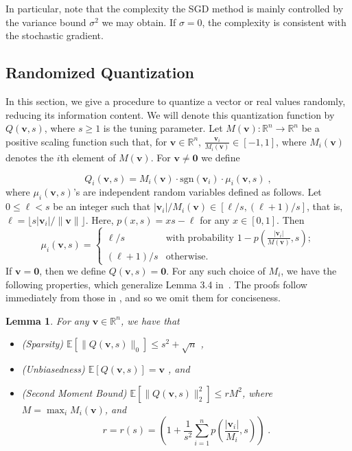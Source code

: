 \documentclass{article}
\newcommand{\R}{\mathbb{R}}
\newcommand{\sgn}[1]{\mbox{sgn}(#1)}
\renewcommand{\vec}[1]{\mathbf{#1}}
\def\E{\mathbb{E}}
\newtheorem{lemma}{Lemma}
\begin{document}
In particular, note that the complexity the SGD method is mainly controlled by the variance bound $\sigma^2$ we may obtain. If $\sigma = 0$, the complexity is consistent with the stochastic gradient.



\subsection{Randomized Quantization}

In this section, we give a procedure to quantize a vector or real values randomly, reducing its information content. We will denote this quantization function by $Q(\vec{v},s)$, where $s\geq 1$ is the tuning parameter. 
Let $M(\vec{v}): \R^n \rightarrow \R^n$ be a positive scaling function such that, for $\vec{v}\in \R^n$, $\frac{\vec{v}_i}{M_i(\vec{v})} \in [-1, 1]$, where $M_i(\vec{v})$ denotes the $i$th element of $M(\vec{v})$.
For $\vec{v} \neq \vec{0}$ we define

\begin{equation}
Q_i(\vec{v},s) = M_i(\vec{v}) \cdot \sgn{\vec{v}_i} \cdot \mu_i(\vec{v},s) \; , \label{equ:quant2}
\end{equation}
where $\mu_i(\vec{v},s)$'s are independent random variables defined as follows. 
Let $0 \leq \ell < s$ be an integer such that $|\vec{v}_i|/M_i(\vec{v}) \in [ \ell / s, (\ell + 1) / s ]$, that is, $\ell = \lfloor s |\vec{v}_i|/\| \vec{v} \| \rfloor$. 
Here, $p(x,s) = x s - \ell$ for any $x \in [0,1]$.
Then 
\[
\mu_i(\vec{v},s) = \left\{ \begin{array}{ll}
         \ell / s & \mbox{with probability $1 - p\left(\frac{|\vec{v}_i|}{M(\vec{v})},s\right)$};\\
         (\ell + 1) / s & \mbox{otherwise}. \end{array} \right.
\]
If $\vec{v} = \vec{0}$, then we define $Q(\vec{v},s) = \vec{0}$.
For any such choice of $M_i$, we have the following properties, which generalize Lemma 3.4 in~\cite{Alistarh:2016:ArXiv}.
The proofs follow immediately from those in \cite{Alistarh:2016:ArXiv}, and so we omit them for conciseness.
\begin{lemma}
\label{lem:quant-facts-2}
 For any $\vec{v} \in \R^n$, we have that 
 \begin{itemize} 
 \item (Sparsity) $\E[ \|Q(\vec{v}, s)\|_0]\leq
 s^2 +\sqrt{n}$ , 
 \item (Unbiasedness) $\E [Q (\vec{v},s)] = \vec{v}$ , and
 \item (Second Moment Bound) 
$\E [\| Q (\vec{v},s) \|_2^2] \leq r M^2$, where $M = \max_i M_i (\vec{v})$, and 
\[
r = r(s) = \left( 1 + \frac{1}{s^2} \sum_{i = 1}^n p\left( \frac{|\vec{v}_i|}{M_i },s \right) \right) \; .
\]
 \end{itemize}
\end{lemma}
\end{document}
